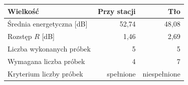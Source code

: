 \begin{tabular}{@{}lrr@{}}
\toprule
Wielkość & Przy stacji & Tło \\
\midrule
Średnia energetyczna [dB] & 52,74 & 48,08 \\
Rozstęp $R$ [dB] & 1,46 & 2,69 \\
Liczba wykonanych próbek & 5 & 5 \\
Wymagana liczba próbek & 4 & 7 \\
Kryterium liczby próbek & spełnione & niespełnione \\
\bottomrule
\end{tabular}
